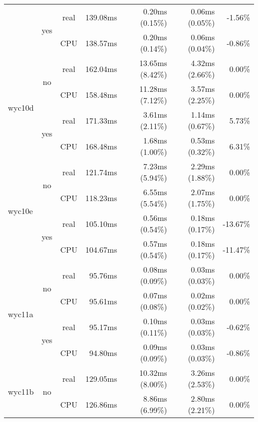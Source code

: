 \documentclass[en]{pracamgr}
\begin{document}
\begin{small}
\begin{longtable}{|l|c|c|r|r|r|r|}
                          \cline{2-7}
                          & \multirow{2}{*}{yes} & real & 139.08ms & 0.20ms (0.15\%) & 0.06ms (0.05\%) & -1.56\% \\*
                          &                      & CPU  & 138.57ms & 0.20ms (0.14\%) & 0.06ms (0.04\%) & -0.86\% \\
\hline
\multirow{4}{*}{wyc10d}   & \multirow{2}{*}{no}  & real & 162.04ms & 13.65ms (8.42\%) & 4.32ms (2.66\%) & 0.00\% \\*
                          &                      & CPU  & 158.48ms & 11.28ms (7.12\%) & 3.57ms (2.25\%) & 0.00\% \\*
                          \cline{2-7}
                          & \multirow{2}{*}{yes} & real & 171.33ms & 3.61ms (2.11\%) & 1.14ms (0.67\%) & 5.73\% \\*
                          &                      & CPU  & 168.48ms & 1.68ms (1.00\%) & 0.53ms (0.32\%) & 6.31\% \\
\hline
\multirow{4}{*}{wyc10e}   & \multirow{2}{*}{no}  & real & 121.74ms & 7.23ms (5.94\%) & 2.29ms (1.88\%) & 0.00\% \\*
                          &                      & CPU  & 118.23ms & 6.55ms (5.54\%) & 2.07ms (1.75\%) & 0.00\% \\*
                          \cline{2-7}
                          & \multirow{2}{*}{yes} & real & 105.10ms & 0.56ms (0.54\%) & 0.18ms (0.17\%) & -13.67\% \\*
                          &                      & CPU  & 104.67ms & 0.57ms (0.54\%) & 0.18ms (0.17\%) & -11.47\% \\
\hline
\multirow{4}{*}{wyc11a}   & \multirow{2}{*}{no}  & real & 95.76ms & 0.08ms (0.09\%) & 0.03ms (0.03\%) & 0.00\% \\*
                          &                      & CPU  & 95.61ms & 0.07ms (0.08\%) & 0.02ms (0.02\%) & 0.00\% \\*
                          \cline{2-7}
                          & \multirow{2}{*}{yes} & real & 95.17ms & 0.10ms (0.11\%) & 0.03ms (0.03\%) & -0.62\% \\*
                          &                      & CPU  & 94.80ms & 0.09ms (0.09\%) & 0.03ms (0.03\%) & -0.86\% \\
\hline
\multirow{4}{*}{wyc11b}   & \multirow{2}{*}{no}  & real & 129.05ms & 10.32ms (8.00\%) & 3.26ms (2.53\%) & 0.00\% \\*
                          &                      & CPU  & 126.86ms & 8.86ms (6.99\%) & 2.80ms (2.21\%) & 0.00\% \\*

\end{longtable}
\end{small}
\end{document}

